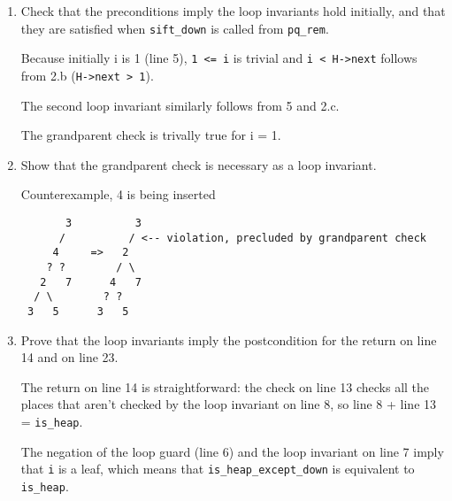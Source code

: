 \begin{enumerate}
\item%
  Check that the preconditions imply the loop invariants hold
  initially, and that they are satisfied when \lstinline'sift_down' is
  called from \lstinline'pq_rem'.

\begin{solution}
  Because initially i is 1 (line 5), %
  \lstinline'1 <= i' %
  is trivial and %
  \lstinline'i < H->next' %
  follows from 2.b %
  (\lstinline'H->next > 1').

  The second loop invariant similarly follows from 5 and 2.c.

  The grandparent check is trivally true for i = 1.
\end{solution}

\item%
  Show that the grandparent check is necessary as a loop invariant.

\begin{solution} Counterexample, 4 is being inserted
\begin{verbatim}
       3          3
      /          / <-- violation, precluded by grandparent check
     4     =>   2
    ? ?        / \
   2   7      4   7
  / \        ? ?
 3   5      3   5

\end{verbatim}
\end{solution}

\item%
  Prove that the loop invariants imply the postcondition for the
  return on line 14 and on line 23.

\begin{solution}
  The return on line 14 is straightforward: the check on line 13
  checks all the places that aren't checked by the loop invariant on
  line 8, so line 8 + line 13 = \lstinline'is_heap'.

  The negation of the loop guard (line 6) and the loop invariant on
  line 7 imply that \lstinline'i' is a leaf, which means that
  \lstinline'is_heap_except_down' is equivalent to
  \lstinline'is_heap'.
\end{solution}
\end{enumerate}
